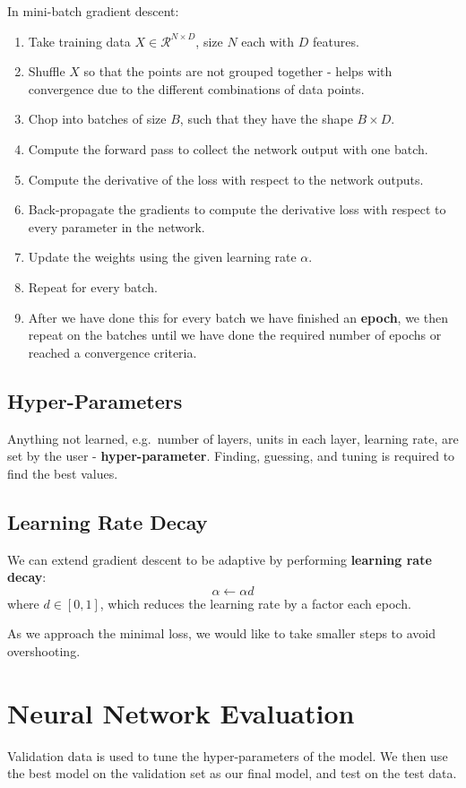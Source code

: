 \documentclass[11pt]{article}
\begin{document}
In mini-batch gradient descent:
\begin{enumerate}
  \item Take training data $X \in \mathcal{R}^{N \times D}$, size $N$ each with $D$ features.
  \item Shuffle $X$ so that the points are not grouped together - helps with convergence due to the different combinations of data points.
  \item Chop into batches of size $B$, such that they have the shape $B \times D$.
  \item Compute the forward pass to collect the network output with one batch.
  \item Compute the derivative of the loss with respect to the network outputs.
  \item Back-propagate the gradients to compute the derivative loss with respect to every parameter in the network.
  \item Update the weights using the given learning rate $\alpha$.
  \item Repeat for every batch.
  \item After we have done this for every batch we have finished an \textbf{epoch}, we then repeat on the batches until we have done the required number of epochs or reached a convergence criteria.
\end{enumerate}

\subsection{Hyper-Parameters}
Anything not learned, e.g.\ number of layers, units in each layer, learning rate, are set by the user - \textbf{hyper-parameter}.
Finding, guessing, and tuning is required to find the best values.

\subsection{Learning Rate Decay}
We can extend gradient descent to be adaptive by performing \textbf{learning rate decay}:
\[
  \alpha \leftarrow \alpha d 
\]
where $d \in [0, 1]$, which reduces the learning rate by a factor each epoch.

As we approach the minimal loss, we would like to take smaller steps to avoid overshooting.

\section{Neural Network Evaluation}
Validation data is used to tune the hyper-parameters of the model.
We then use the best model on the validation set as our final model, and test on the test data.
\end{document}
